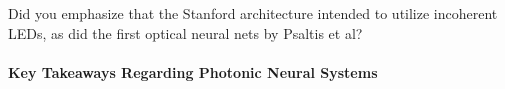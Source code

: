 \cite{fesh2017}

\cite{wuso2014}

\cite{mebo2015}

\cite{tafe2019}

\cite{rokr2009}

\cite{mawa2014}

\cite{mime2018}

\cite{geme2019}

\cite{2018}


\vspace{3em}
Did you emphasize that the Stanford architecture intended to utilize incoherent LEDs, as did the first optical neural nets by Psaltis et al?

\paragraph{Key Takeaways Regarding Photonic Neural Systems}


